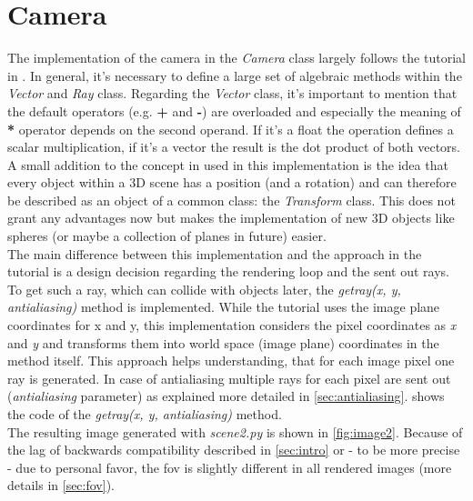 \documentclass[]{article}
\begin{document}
	\section{Camera}
	\label{sec:camera}
	The implementation of the camera in the \emph{Camera} class largely follows the tutorial in \cite{Shirley2020RTW1}. In general, it’s necessary to define a large set of algebraic methods within the \emph{Vector} and \emph{Ray} class. Regarding the \emph{Vector} class, it’s important to mention that the default operators (e.g. \textbf{+} and \textbf{-}) are overloaded and especially the meaning of \textbf{*} operator depends on the second operand. If it’s a float the operation defines a scalar multiplication, if it’s a vector the result is the dot product of both vectors.
	\\
	A small addition to the concept in \cite{Shirley2020RTW1} used in this implementation is the idea that every object within a 3D scene has a position (and a rotation) and can therefore be described as an object of a common class: the \emph{Transform} class. This does not grant any advantages now but makes the implementation of new 3D objects like spheres (or maybe a collection of planes in future) easier.
	\\
	The main difference between this implementation and the approach in the tutorial is a design decision regarding the rendering loop and the sent out rays. To get such a ray, which can collide with objects later, the \emph{get\textunderscore ray(x, y, antialiasing)} method is implemented. While the tutorial uses the image plane coordinates for x and y, this implementation considers the pixel coordinates as \emph{x} and \emph{y} and transforms them into world space (image plane) coordinates in the method itself. This approach helps understanding, that for each image pixel one ray is generated. In case of antialiasing multiple rays for each pixel are sent out (\emph{antialiasing} parameter) as explained more detailed in \cref{sec:antialiasing}.  shows the code of the \emph{get\textunderscore ray(x, y, antialiasing)} method.
	\\
	The resulting image generated with \emph{scene2.py} is shown in \cref{fig:image2}. Because of the lag of backwards compatibility described in \cref{sec:intro} or - to be more precise - due to personal favor, the \ac{fov} is slightly different in all rendered images (more details in \cref{sec:fov}). 
\end{document}

